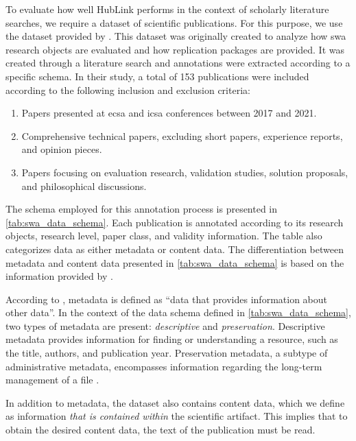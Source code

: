 To evaluate how well HubLink performs in the context of scholarly literature searches, we require a dataset of scientific publications. For this purpose, we use the dataset provided by \textcite{konersmann_evaluation_2022}. This dataset was originally created to analyze how \gls{swa} research objects are evaluated and how replication packages are provided. It was created through a literature search and annotations were extracted according to a specific schema. In their study, a total of 153 publications were included according to the following inclusion and exclusion criteria:

\begin{enumerate}
    \item Papers presented at \gls{ecsa} and \gls{icsa} conferences between 2017 and 2021.
    \item Comprehensive technical papers, excluding short papers, experience reports, and opinion pieces.
    \item Papers focusing on evaluation research, validation studies, solution proposals, and philosophical discussions.
\end{enumerate}

The schema employed for this annotation process is presented in \autoref{tab:swa_data_schema}. Each publication is annotated according to its research objects, research level, paper class, and validity information. The table also categorizes data as either metadata or content data. The differentiation between metadata and content data presented in \autoref{tab:swa_data_schema} is based on the information provided by \textcite{konersmann_evaluation_2022}.

According to \textcite{riley_understanding_2017}, metadata is defined as \enquote{data that provides information about other data}. In the context of the data schema defined in \autoref{tab:swa_data_schema}, two types of metadata are present: \emph{descriptive} and \emph{preservation}. Descriptive metadata provides information for finding or understanding a resource, such as the title, authors, and publication year. Preservation metadata, a subtype of administrative metadata, encompasses information regarding the long-term management of a file \cite{riley_understanding_2017}.

In addition to metadata, the dataset also contains content data, which we define as information \emph{that is contained within} the scientific artifact. This implies that to obtain the desired content data, the text of the publication must be read.

